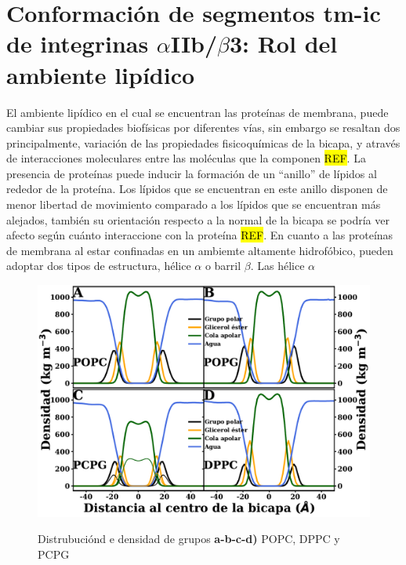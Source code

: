 \chapter{Conformación de segmentos \ac{tm}-\ac{ic} de integrinas $\alpha$IIb/$\beta$3: Rol del ambiente lipídico}\label{chap:dm}

El ambiente lipídico en el cual se encuentran las proteínas de membrana, puede cambiar sus propiedades biofísicas por diferentes vías, sin embargo se resaltan dos principalmente, variación de las propiedades fisicoquímicas de la bicapa, y através de interacciones moleculares entre las moléculas que la componen \hl{REF}. La presencia de proteínas puede inducir la formación de un ``anillo'' de lípidos al rededor de la proteína.  Los lípidos que se encuentran en este anillo disponen de menor libertad de movimiento  comparado a los lípidos que se encuentran más alejados, también su orientación respecto a la normal de la bicapa se podría ver afecto según cuánto interaccione con la proteína \hl{REF}. En cuanto a las proteínas de membrana al estar confinadas en un ambiemte altamente hidrofóbico, pueden adoptar dos tipos de estructura, hélice $\alpha$ o barril $\beta$. Las hélice $\alpha$ 





\begin{figure}[H]
    \centering
	\includegraphics[width=1\linewidth, height=0.8\textheight, keepaspectratio]{fig/02_dm/density_all.pdf} 
	\caption[]{Distrubuciónd e densidad de grupos  \textbf{a-b-c-d)} POPC, DPPC y PCPG}
    \label{fig:densidad}
\end{figure}


